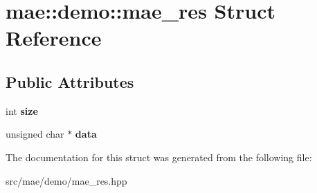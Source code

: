 \hypertarget{structmae_1_1demo_1_1mae__res}{\section{mae\-:\-:demo\-:\-:mae\-\_\-res Struct Reference}
\label{structmae_1_1demo_1_1mae__res}
}
\subsection*{Public Attributes}
\begin{DoxyCompactItemize}
\item 
\hypertarget{structmae_1_1demo_1_1mae__res_a22c1410c842383d81394aac1d4ba12b6}{int {\bfseries size}}\label{structmae_1_1demo_1_1mae__res_a22c1410c842383d81394aac1d4ba12b6}

\item 
\hypertarget{structmae_1_1demo_1_1mae__res_a491afc730c807643e1d00b20033e4f06}{unsigned char $\ast$ {\bfseries data}}\label{structmae_1_1demo_1_1mae__res_a491afc730c807643e1d00b20033e4f06}

\end{DoxyCompactItemize}


The documentation for this struct was generated from the following file\-:\begin{DoxyCompactItemize}
\item 
src/mae/demo/mae\-\_\-res.\-hpp\end{DoxyCompactItemize}
